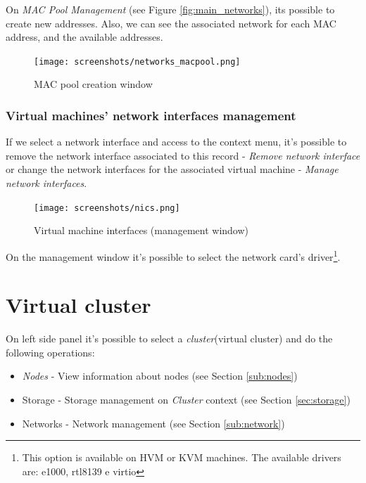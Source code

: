 On \emph{MAC Pool Management} (see Figure \ref{fig:main_networks}), its possible to create new addresses.
Also, we can see the associated network for each MAC address, and the available addresses.

\begin{figure}[H]
	\begin{center}
	\texttt{[image: screenshots/networks\_macpool.png]}
	\caption{MAC pool creation window}
	\label{fig:networks_macpool}
	\end{center}
\end{figure}


\subsubsection{Virtual machines' network interfaces management}
If we select a network interface and access to the context menu, it's possible to remove the network interface associated to this record - \emph{Remove network interface} or change the network interfaces for the associated virtual machine - \emph{Manage network interfaces}.

\begin{figure}[H]
	\begin{center}
	\texttt{[image: screenshots/nics.png]}
	\caption{Virtual machine interfaces (management window)}
	\label{fig:nics}
	\end{center}
\end{figure}

On the management window it's possible to select the network card's driver\footnote{This option is available on HVM or KVM machines. The available drivers are: e1000, rtl8139 e virtio}.

\section{Virtual cluster}
\label{sec:cluster}

On left side panel it's possible to select a \emph{cluster}(virtual cluster) and do the following operations:

\begin{itemize}
    \item \emph{Nodes} - View information about nodes (see Section \ref{sub:nodes})
    \item Storage - Storage management on \emph{Cluster} context (see Section \ref{sec:storage})
    \item Networks - Network management (see Section \ref{sub:network})
\end{itemize}

